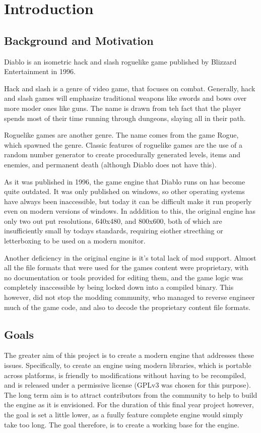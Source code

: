 \chapter{Introduction}
	\section{Background and Motivation}
	Diablo is an isometric hack and slash roguelike game published by Blizzard Entertainment in 1996\cite{diablo}.
	
	Hack and slash is a genre of video game, that focuses on combat. Generally, hack and slash games will emphasize   traditional weapons like swords and bows over more moder ones like guns. The name is drawn from teh fact that the player spends most of their time running through dungeons, slaying all in their path.
	
	Roguelike games are another genre. The name comes from the game Rogue\cite{rogue}, which spawned the genre.
	Classic features of roguelike games are the use of a random number generator to create procedurally generated levels, items and enemies, and permanent death (although Diablo does not have this).
	
	As it was published in 1996, the game engine that Diablo runs on has become quite outdated. It was only published on windows, so other operating systems have always been inaccessible, but today it can be difficult make it run properly even on modern versions of windows.
	In adddition to this, the original engine has only two out put resolutions, 640x480, and 800x600, both of which are insufficiently small by todays standards, requiring eiother strecthing or letterboxing to be used on a modern monitor.
	
	Another deficiency in the original engine is it's total lack of mod support. Almost all the file formats that were used for the games content were proprietary, with no documentation or tools provided for editing them, and the game logic was completely inaccessible by being locked down into a compiled binary. This however, did not stop the modding community, who managed to reverse engineer much of the game code, and also to decode the proprietary content file formats.

	\section{Goals}	
	The greater aim of this project is to create a modern engine that addresses these issues. Specifically, to create an engine using modern libraries, which is portable across platforms, is friendly to modifications without having to be recompiled, and is released under a permissive license (GPLv3 was chosen for this purpose).
	The long term aim is to attract contributors from the community to help to build the engine as it is envisioned. For the duration of this final year project however, the goal is set a little lower, as a fuully feature complete engine would simply take too long. The goal therefore, is to create a working base for the engine.
	
